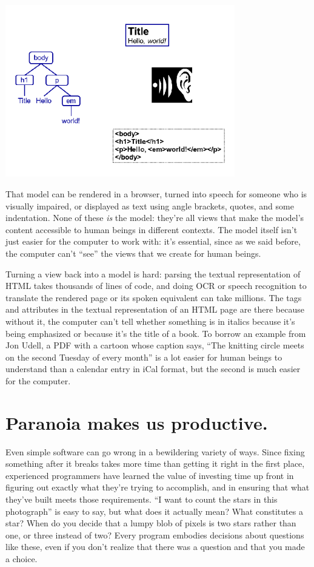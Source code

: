 \documentclass[10pt,letterpaper]{article}
\newcommand{\rulemajor}[1]{\section{#1}}
\begin{document}
\includegraphics[width=10.0cm]{modelview.png}

That model can be rendered in a browser, turned into speech for someone who is
visually impaired, or displayed as text using angle brackets, quotes, and some
indentation.  None of these \emph{is} the model: they're all views that make the
model's content accessible to human beings in different contexts.  The model
itself isn't just easier for the computer to work with: it's essential, since as
we said before, the computer can't ``see'' the views that we create for human
beings.

Turning a view back into a model is hard: parsing the textual representation of
HTML takes thousands of lines of code, and doing OCR or speech recognition to
translate the rendered page or its spoken equivalent can take millions.  The
tags and attributes in the textual representation of an HTML page are there
because without it, the computer can't tell whether something is in italics
because it's being emphasized or because it's the title of a book.  To borrow an
example from Jon Udell, a PDF with a cartoon whose caption says, ``The knitting
circle meets on the second Tuesday of every month'' is a lot easier for human
beings to understand than a calendar entry in iCal format, but the second is
much easier for the computer.

\rulemajor{Paranoia makes us productive.}

Even simple software can go wrong in a bewildering variety of ways.  Since
fixing something after it breaks takes more time than getting it right in the
first place, experienced programmers have learned the value of investing time up
front in figuring out exactly what they're trying to accomplish, and in ensuring
that what they've built meets those requirements.  ``I want to count the stars
in this photograph'' is easy to say, but what does it actually mean?  What
constitutes a star?  When do you decide that a lumpy blob of pixels is two stars
rather than one, or three instead of two?  Every program embodies decisions
about questions like these, even if you don't realize that there was a question
and that you made a choice.
\end{document}
